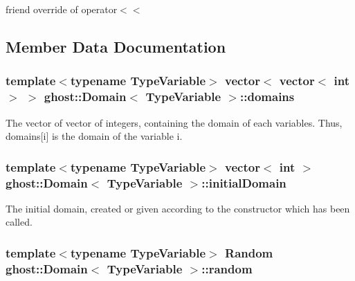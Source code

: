 friend override of operator$<$$<$ 



\subsection{Member Data Documentation}
\hypertarget{classghost_1_1Domain_a6940f37aa773c6c94cff18cfe1e6a7f7}{
\subsubsection[{domains}]{\setlength{\rightskip}{0pt plus 5cm}template$<$typename Type\-Variable$>$ vector$<$ vector$<$ int $>$ $>$ {\bf ghost\-::\-Domain}$<$ Type\-Variable $>$\-::domains\hspace{0.3cm}{\ttfamily [protected]}}}\label{classghost_1_1Domain_a6940f37aa773c6c94cff18cfe1e6a7f7}


The vector of vector of integers, containing the domain of each variables. Thus, domains\mbox{[}i\mbox{]} is the domain of the variable i. 

\hypertarget{classghost_1_1Domain_a8890ca1323c293a4a1e2aa1830eff043}{
\subsubsection[{initial\-Domain}]{\setlength{\rightskip}{0pt plus 5cm}template$<$typename Type\-Variable$>$ vector$<$ int $>$ {\bf ghost\-::\-Domain}$<$ Type\-Variable $>$\-::initial\-Domain\hspace{0.3cm}{\ttfamily [protected]}}}\label{classghost_1_1Domain_a8890ca1323c293a4a1e2aa1830eff043}


The initial domain, created or given according to the constructor which has been called. 

\hypertarget{classghost_1_1Domain_ab6a7a58f8a147f5b2b475e106627fad2}{
\subsubsection[{random}]{\setlength{\rightskip}{0pt plus 5cm}template$<$typename Type\-Variable$>$ {\bf Random} {\bf ghost\-::\-Domain}$<$ Type\-Variable $>$\-::random\hspace{0.3cm}{\ttfamily [protected]}}}\label{classghost_1_1Domain_ab6a7a58f8a147f5b2b475e106627fad2}


